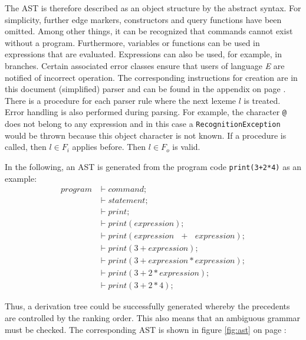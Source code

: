 The AST is therefore described as an object structure by the abstract syntax. For simplicity, further edge markers, constructors and query functions have been omitted. Among other things, it can be recognized that commands cannot exist without a program. Furthermore, variables or functions can be used in expressions that are evaluated. Expressions can also be used, for example, in branches. Certain associated error classes ensure that users of language \emph{E} are notified of incorrect operation. The corresponding instructions for creation are in this document (simplified) parser and can be found in the appendix on page \pageref{sec:parser}. There is a procedure for each parser rule where the next lexeme $l$ is treated. Error handling is also performed during parsing. For example, the character \texttt{@} does not belong to any expression and in this case a \texttt{RecognitionException} would be thrown because this object character is not known. If a procedure is called, then $l \in F_i$ applies before. Then $l \in F_o$ is valid.

In the following, an AST is generated from the program code \texttt{print(3+2*4)} as an example:
\begin{align*}
program &\vdash command;\\
&\vdash statement;\\
&\vdash print;\\
&\vdash print(expression);\\
&\vdash print(expression\text{ }+\text{ }expression);\\
&\vdash print(3+expression);\\
&\vdash print(3+expression*expression);\\
&\vdash print(3+2*expression);\\
&\vdash print(3+2*4);
\end{align*}

Thus, a derivation tree could be successfully generated whereby the precedents are controlled by the ranking order. This also means that an ambiguous grammar must be checked. The corresponding AST is shown in figure \ref{fig:ast} on page \pageref{fig:ast}:

\newpage

